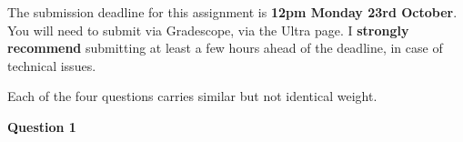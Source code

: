 \documentclass[11pt,a4paper]{article}
\begin{document}

\setcounter{section}{1}

\setcounter{aufg}{0}


The submission deadline for this assignment is \textbf{12pm Monday 23rd October}. You will need to submit via Gradescope, via the Ultra page. I \textbf{strongly recommend} submitting at least a few hours ahead of the deadline, in case of technical issues.

Each of the four questions carries similar but not identical weight.



\vspace{0.2cm}

\textbf{Question 1}

\vspace{0.2cm}
\end{document}
